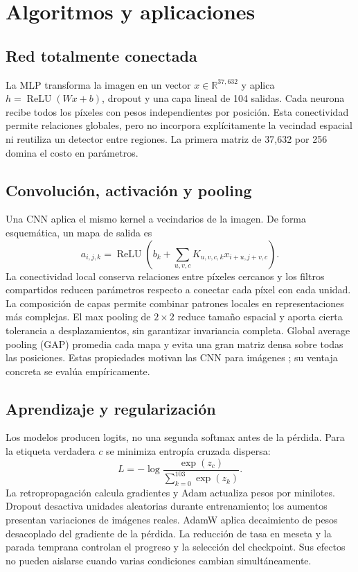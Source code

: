 \section{Algoritmos y aplicaciones}
\subsection{Red totalmente conectada}
La MLP transforma la imagen en un vector $x\in\mathbb{R}^{37,632}$ y aplica
$h=\operatorname{ReLU}(Wx+b)$, dropout y una capa lineal de 104 salidas.
Cada neurona recibe todos los píxeles con pesos independientes por posición.
Esta conectividad permite relaciones globales, pero no incorpora explícitamente
la vecindad espacial ni reutiliza un detector entre regiones. La primera matriz
de 37,632 por 256 domina el costo en parámetros.

\subsection{Convolución, activación y pooling}
Una CNN aplica el mismo kernel a vecindarios de la imagen. De forma esquemática,
un mapa de salida es
\begin{equation}
a_{i,j,k}=\operatorname{ReLU}\!\left(b_k+\sum_{u,v,c}K_{u,v,c,k}x_{i+u,j+v,c}\right).
\end{equation}
La conectividad local conserva relaciones entre píxeles cercanos y los filtros
compartidos reducen parámetros respecto a conectar cada píxel con cada unidad.
La composición de capas permite combinar patrones locales en representaciones
más complejas. El max pooling de $2\times2$ reduce tamaño espacial y aporta
cierta tolerancia a desplazamientos, sin garantizar invariancia completa.
Global average pooling (GAP) promedia cada mapa y evita una gran matriz densa
sobre todas las posiciones. Estas propiedades motivan las CNN para imágenes
\citep{ibmWhatImage}; su ventaja concreta se evalúa empíricamente.

\subsection{Aprendizaje y regularización}
Los modelos producen logits, no una segunda softmax antes de la pérdida. Para
la etiqueta verdadera $c$ se minimiza entropía cruzada dispersa:
\begin{equation}
L=-\log\frac{\exp(z_c)}{\sum_{k=0}^{103}\exp(z_k)}.
\end{equation}
La retropropagación calcula gradientes y Adam actualiza pesos por minilotes.
Dropout desactiva unidades aleatorias durante entrenamiento; los aumentos
presentan variaciones de imágenes reales. AdamW aplica decaimiento de pesos
desacoplado del gradiente de la pérdida. La reducción de tasa en meseta y la
parada temprana controlan el progreso y la selección del checkpoint. Sus efectos
no pueden aislarse cuando varias condiciones cambian simultáneamente.

